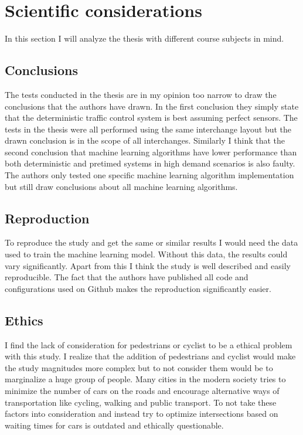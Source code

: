 \documentclass[10pt, a4paper]{article}
\begin{document}
\section{Scientific considerations}
In this section I will analyze the thesis with different course subjects in mind.
\subsection{Conclusions}
The tests conducted in the thesis are in my opinion too narrow to draw the conclusions that the authors have drawn. In the first conclusion
they simply state that the deterministic traffic control system is best assuming perfect sensors.
The tests in the thesis were all performed using the same interchange layout but the drawn conclusion is in the scope of all interchanges.
Similarly I think that the second conclusion that machine learning algorithms have lower performance than both deterministic and pretimed
systems in high demand scenarios is also faulty. The authors only tested one specific machine learning algorithm implementation but still
draw conclusions about all machine learning algorithms.

\subsection{Reproduction}
To reproduce the study and get the same or similar results I would need the data used to train the machine learning model.
Without this data, the results could vary significantly. Apart from this I think the study is well described and easily reproducible.
The fact that the authors have published all code and configurations used on Github makes the reproduction significantly easier.

\subsection{Ethics}
I find the lack of consideration for pedestrians or cyclist to be a ethical problem with this study. I realize that the addition of pedestrians
and cyclist would make the study magnitudes more complex but to not consider them would be to marginalize a huge group of people.
Many cities in the modern society tries to minimize the number of cars on the roads and encourage alternative ways of transportation
like cycling, walking and public transport. To not take these factors into consideration and instead try to optimize intersections based on
waiting times for cars is outdated and ethically questionable.
\end{document}
